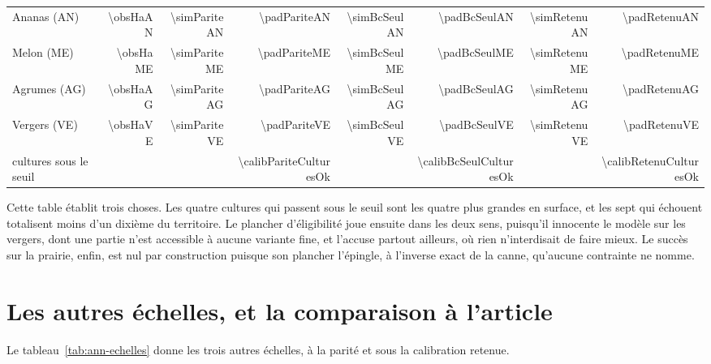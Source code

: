 \begin{table}[h]
\begin{tabular}{@{}lrrrrrrr@{}}
    Ananas (AN) & \num{\obsHaAN} & \num{\simPariteAN} & \num{\padPariteAN}
      & \num{\simBcSeulAN} & \num{\padBcSeulAN} & \num{\simRetenuAN} & \num{\padRetenuAN} \\
    Melon (ME) & \num{\obsHaME} & \num{\simPariteME} & \num{\padPariteME}
      & \num{\simBcSeulME} & \num{\padBcSeulME} & \num{\simRetenuME} & \num{\padRetenuME} \\
    Agrumes (AG) & \num{\obsHaAG} & \num{\simPariteAG} & \num{\padPariteAG}
      & \num{\simBcSeulAG} & \num{\padBcSeulAG} & \num{\simRetenuAG} & \num{\padRetenuAG} \\
    Vergers (VE) & \num{\obsHaVE} & \num{\simPariteVE} & \num{\padPariteVE}
      & \num{\simBcSeulVE} & \num{\padBcSeulVE} & \num{\simRetenuVE} & \num{\padRetenuVE} \\
    \midrule
    cultures sous le seuil & & & \num{\calibPariteCulturesOk}
      & & \num{\calibBcSeulCulturesOk} & & \num{\calibRetenuCulturesOk} \\
    \bottomrule
  \end{tabular}
\end{table}

Cette table établit trois choses. Les quatre cultures qui passent sous le seuil sont les
quatre plus grandes en surface, et les sept qui échouent totalisent moins d'un dixième du
territoire. Le plancher d'éligibilité joue ensuite dans les deux sens, puisqu'il innocente le
modèle sur les vergers, dont une partie n'est accessible à aucune variante fine, et l'accuse
partout ailleurs, où rien n'interdisait de faire mieux. Le succès sur la prairie, enfin, est
nul par construction puisque son plancher l'épingle, à l'inverse exact de la canne, qu'aucune
contrainte ne nomme.

\section{Les autres échelles, et la comparaison à l'article}

Le tableau~\ref{tab:ann-echelles} donne les trois autres échelles, à la parité et sous la
calibration retenue.

